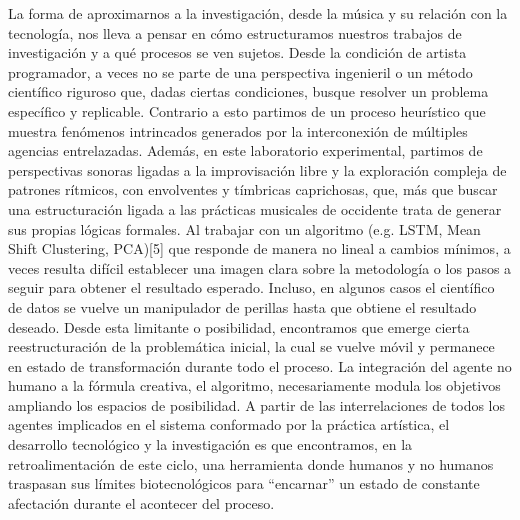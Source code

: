 La forma de aproximarnos a la investigación, desde la música y su relación con la tecnología, nos lleva a pensar en cómo estructuramos nuestros trabajos de investigación y a qué procesos se ven sujetos. Desde la condición de artista programador, a veces no se parte de una perspectiva ingenieril o un método científico riguroso que, dadas ciertas condiciones, busque resolver un problema específico y replicable. Contrario a esto partimos de un proceso heurístico que muestra fenómenos intrincados generados por la interconexión de múltiples agencias entrelazadas. Además, en este laboratorio experimental, partimos de perspectivas sonoras ligadas a la improvisación libre y la exploración compleja de patrones rítmicos, con envolventes y tímbricas caprichosas, que, más que buscar una estructuración ligada a las prácticas musicales de occidente trata de generar sus propias lógicas formales. Al trabajar con un algoritmo (e.g. LSTM, Mean Shift Clustering, PCA)[5] que responde de manera no lineal a cambios mínimos, a veces resulta difícil establecer una imagen clara sobre la metodología o los pasos a seguir para obtener el resultado esperado. Incluso, en algunos casos el científico de datos se vuelve un manipulador de perillas hasta que obtiene el resultado deseado. Desde esta limitante o posibilidad, encontramos que emerge cierta reestructuración de la problemática inicial, la cual se vuelve móvil y permanece en estado de transformación durante todo el proceso. La integración del agente no humano a la fórmula creativa, el algoritmo, necesariamente modula los objetivos ampliando los espacios de posibilidad. A partir de las interrelaciones de todos los agentes implicados en el sistema conformado por la práctica artística, el desarrollo tecnológico y la investigación es que encontramos, en la retroalimentación de este ciclo, una herramienta donde humanos y no humanos traspasan sus límites biotecnológicos para “encarnar” un estado de constante afectación durante el acontecer del proceso. 

